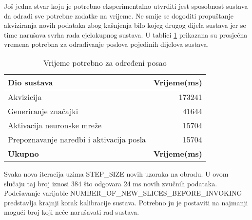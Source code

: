 Još jedna stvar koju je potrebno eksperimentalno utvrditi jest sposobnost sustava da
odradi sve potrebne zadatke na vrijeme. Ne smije se dogoditi propuštanje akviziranja
novih podataka zbog kašnjenja bilo kojeg drugog dijela sustava jer se time narušava
svrha rada cjelokupnog sustava. U tablici \ref{tab:rts} prikazana su prosječna
vremena potrebna za odrađivanje poslova pojedinih dijelova sustava.

\begin{table}[htb]
    \centering
    \begin{tabular}{|l|r|}
        \hline
        \textbf{Dio sustava} & \textbf{Vrijeme(ms)} \\ \hline
        Akvizicija & 173241\\ \hline
        Generiranje značajki & 41644 \\ \hline
        Aktivacija neuronske mreže & 15704 \\ \hline
        Prepoznavanje naredbi i aktivacija posla & 15704 \\ \hline
        \textbf{Ukupno} & \textbf{Vrijeme(ms)} \\ \hline
    \end{tabular}
    \caption{Vrijeme potrebno za određeni posao}
    \label{tab:rts}
\end{table}

Svaka nova iteracija uzima STEP\_SIZE novih uzoraka na obradu. U ovom slučaju
taj broj iznosi 384 što odgovara 24 ms novih zvučnih podataka. Podešavanje varijable
NUMBER\_OF\_NEW\_SLICES\_BEFORE\_INVOKING predstavlja krajnji korak kalibracije sustava.
Potrebno ju je postaviti na najmanji mogući broj koji neće narušavati rad sustava.
